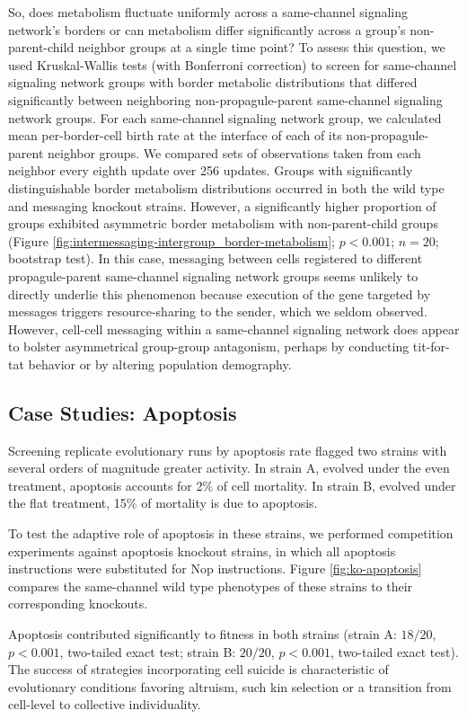 So, does metabolism fluctuate uniformly across a same-channel signaling network's borders or can metabolism differ significantly across a group's non-parent-child neighbor groups at a single time point?
To assess this question, we used Kruskal-Wallis tests (with Bonferroni correction) to screen for same-channel signaling network groups with border metabolic distributions that differed significantly between neighboring non-propagule-parent same-channel signaling network groups.
For each same-channel signaling network group, we calculated mean per-border-cell birth rate at the interface of each of its non-propagule-parent neighbor groups.
We compared sets of observations taken from each neighbor every eighth update over 256 updates.
Groups with significantly distinguishable border metabolism distributions occurred in both the wild type and messaging knockout strains.
However, a significantly higher proportion of groups exhibited asymmetric border metabolism with non-parent-child groups (Figure \ref{fig:intermessaging-intergroup_border-metabolism}; $p < 0.001$; $n=20$; bootstrap test).
In this case, messaging between cells registered to different propagule-parent same-channel signaling network groups seems unlikely to directly underlie this phenomenon because execution of the gene targeted by messages triggers resource-sharing to the sender, which we seldom observed.
However, cell-cell messaging within a same-channel signaling network does appear to bolster asymmetrical group-group antagonism, perhaps by conducting tit-for-tat behavior or by altering population demography.

\subsection{Case Studies: Apoptosis} \label{sec:apoptosis}



Screening replicate evolutionary runs by apoptosis rate flagged two strains with several orders of magnitude greater activity.
In strain A, evolved under the even treatment, apoptosis accounts for 2\% of cell mortality.
In strain B, evolved under the flat treatment, 15\% of mortality is due to apoptosis.

To test the adaptive role of apoptosis in these strains, we performed competition experiments against apoptosis knockout strains, in which all apoptosis instructions were substituted for Nop instructions.
Figure \ref{fig:ko-apoptosis} compares the same-channel wild type phenotypes of these strains to their corresponding knockouts.

Apoptosis contributed significantly to fitness in both strains (strain A: $18/20$, $p < 0.001$, two-tailed exact test; strain B: $20/20$, $p < 0.001$, two-tailed exact test).
The success of strategies incorporating cell suicide is characteristic of evolutionary conditions favoring altruism, such kin selection or a transition from cell-level to collective individuality.
